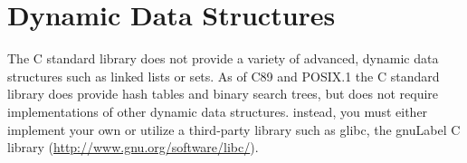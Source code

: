 \section{Dynamic Data Structures}

The C standard library does not provide a variety of advanced, dynamic
data structures such as linked lists or sets.  As of C89 and POSIX.1 the
C standard library does provide hash tables and binary search trees, but
does not require implementations of other dynamic data structures.
instead, you must either implement your own or utilize a third-party 
library such as glibc, the \gls{gnuLabel} C library 
(\url{http://www.gnu.org/software/libc/}).





